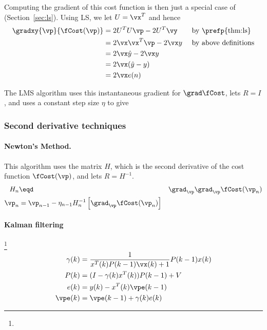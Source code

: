 {Computing the gradient of this cost function is then
just a special case of  (Section~\ref{sec:ls}).
Using LS, we let $U=\vx^T$ and hence
\begin{align*}
   \gradxy{\vp}{\fCost(\vp)}
   &= 2U^TU \vp -2U^T\vy                   && \text{ by \prefp{thm:ls}}
\\ &= 2\vx\vx^T \vp -2\vx y               && \text{ by above definitions}
\\ &= 2\vx\hat{y} -2\vx y                    && \text{ }
\\ &= 2\vx(\hat{y} -y)                      && \text{ }
\\ &= 2\vx e(n)                && \text{ }
\end{align*}

The LMS algorithm uses this instantaneous gradient for $\grad\fCost$,
lets $R=I$, and uses a constant step size $\eta$ to give
\subsubsection*{Second derivative techniques}
\paragraph{Newton's Method.}
This algorithm uses the  matrix $H$,
which is the second derivative of the cost function $\fCost(\vp)$,
and lets $R=H^{-1}$.
\begin{align*}
   H_n &\eqd& \grad_\vp\grad_\vp \fCost(\vp_n)
\\
   \vp_n &= \vp_{n-1} - \eta_{n-1} H_n^{-1} \left[\grad_\vp\fCost(\vp_n)\right]
\end{align*}


\paragraph{Kalman filtering}\footnote{}
\begin{align*}
   \gamma(k) &= \frac{1}{x^T(k)P(k-1)\vx(k)+1}P(k-1)x(k) \\
   P(k) &= (I-\gamma(k)x^T(k))P(k-1)+V \\
   e(k) &= y(k) - x^T(k)\vpe(k-1) \\
   \vpe(k) &= \vpe(k-1) + \gamma(k)e(k)
\end{align*}

}
